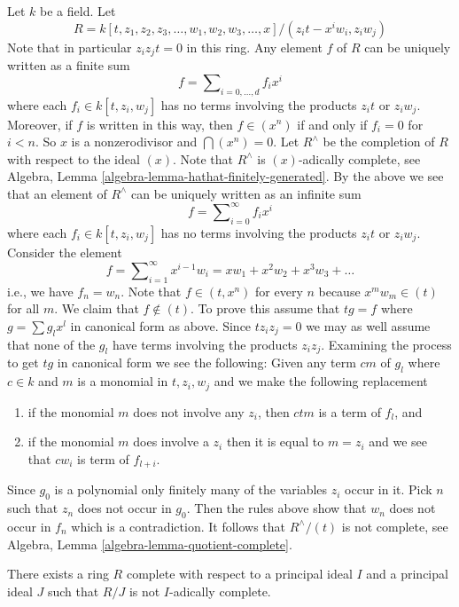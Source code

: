 \noindent
Let $k$ be a field. Let
$$
R = k[t, z_1, z_2, z_3, \ldots, w_1, w_2, w_3, \ldots, x]/
(z_it - x^iw_i, z_i w_j)
$$
Note that in particular $z_iz_jt = 0$ in this ring. Any element $f$ of $R$
can be uniquely written as a finite sum
$$
f = \sum\nolimits_{i = 0, \ldots, d} f_i x^i
$$
where each $f_i \in k[t, z_i, w_j]$ has no terms involving the products
$z_it$ or $z_iw_j$. Moreover, if $f$ is written in this way, then
$f \in (x^n)$ if and only if $f_i = 0$ for $i < n$.
So $x$ is a nonzerodivisor and $\bigcap (x^n) = 0$.
Let $R^\wedge$ be the completion of $R$ with respect to the ideal $(x)$.
Note that $R^\wedge$ is $(x)$-adically complete, see
Algebra, Lemma \ref{algebra-lemma-hathat-finitely-generated}.
By the above we see that an element of $R^\wedge$ can be uniquely written
as an infinite sum
$$
f = \sum\nolimits_{i = 0}^\infty f_i x^i
$$
where each $f_i \in k[t, z_i, w_j]$ has no terms involving the products
$z_it$ or $z_iw_j$. Consider the element
$$
f = \sum\nolimits_{i = 1}^\infty x^{i - 1} w_i =
xw_1 + x^2w_2 + x^3w_3 + \ldots
$$
i.e., we have $f_n = w_n$. Note that $f \in (t , x^n)$ for every $n$
because $x^mw_m \in (t)$ for all $m$.
We claim that $f \not \in (t)$. To prove this assume that
$tg = f$ where $g = \sum g_lx^l$ in canonical form as above.
Since $tz_iz_j = 0$ we may as well assume that none of the $g_l$ have
terms involving the products $z_iz_j$. Examining the process to
get $tg$ in canonical form we see the following:
Given any term $c m$ of $g_l$ where $c \in k$ and $m$ is a
monomial in $t, z_i, w_j$ and we make the following replacement
\begin{enumerate}
\item if the monomial $m$ does not involve any $z_i$, then $ctm$ is
a term of $f_l$, and
\item if the monomial $m$ does involve a $z_i$ then it is equal to
$m = z_i$ and we see that $cw_i$ is term of $f_{l + i}$.
\end{enumerate}
Since $g_0$ is a polynomial only finitely many of the variables $z_i$
occur in it. Pick $n$ such that $z_n$ does not occur in $g_0$.
Then the rules above show that $w_n$ does not occur in $f_n$ which is
a contradiction. It follows that $R^\wedge/(t)$ is not complete, see
Algebra, Lemma \ref{algebra-lemma-quotient-complete}.

\begin{lemma}
\label{lemma-noncomplete-quotient}
There exists a ring $R$ complete with respect to a principal ideal
$I$ and a principal ideal $J$ such that $R/J$ is not $I$-adically
complete.
\end{lemma}

